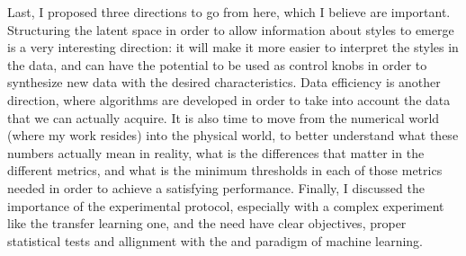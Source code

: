   \par Last, I proposed three directions to go from here, which I believe are important. Structuring the latent space in order to allow information about styles to emerge is a very interesting direction: it will make it more easier to interpret the styles in the data, and can have the potential to be used as control knobs in order to synthesize new data with the desired characteristics. Data efficiency is another direction, where algorithms are developed in order to take into account the data that we can actually acquire. It is also time to move from the numerical world (where my work resides) into the physical world, to better understand what these numbers actually mean in reality, what is the differences that matter in the different metrics, and what is the minimum thresholds in each of those metrics needed in order to achieve a satisfying performance. Finally, I discussed the importance of the experimental protocol, especially with a complex experiment like the transfer learning one, and the need have clear objectives, proper statistical tests and allignment with the and paradigm of machine learning.


